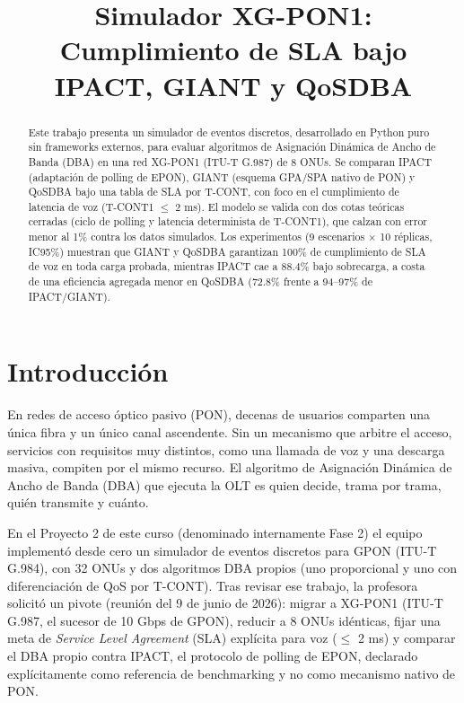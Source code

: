 \documentclass[conference]{IEEEtran}
\begin{document}
\title{Simulador XG-PON1: Cumplimiento de SLA bajo IPACT, GIANT y QoSDBA}

\author{
}

\maketitle

\begin{abstract}
Este trabajo presenta un simulador de eventos discretos, desarrollado en
Python puro sin frameworks externos, para evaluar algoritmos de Asignación
Dinámica de Ancho de Banda (DBA) en una red XG-PON1 (ITU-T G.987) de 8
ONUs. Se comparan IPACT (adaptación de polling de EPON), GIANT (esquema
GPA/SPA nativo de PON) y QoSDBA bajo una tabla de SLA por T-CONT, con foco
en el cumplimiento de latencia de voz (T-CONT1 $\leq$ 2 ms). El modelo se
valida con dos cotas teóricas cerradas (ciclo de polling y latencia
determinista de T-CONT1), que calzan con error menor al 1\% contra los
datos simulados. Los experimentos (9 escenarios $\times$ 10 réplicas,
IC95\%) muestran que GIANT y QoSDBA garantizan 100\% de cumplimiento de
SLA de voz en toda carga probada, mientras IPACT cae a 88.4\% bajo
sobrecarga, a costa de una eficiencia agregada menor en QoSDBA (72.8\%
frente a 94--97\% de IPACT/GIANT).
\end{abstract}

\section{Introducción}

En redes de acceso óptico pasivo (PON), decenas de usuarios comparten una
única fibra y un único canal ascendente. Sin un mecanismo que arbitre el
acceso, servicios con requisitos muy distintos, como una llamada de voz y
una descarga masiva, compiten por el mismo recurso. El algoritmo de
Asignación Dinámica de Ancho de Banda (DBA) que ejecuta la OLT es quien
decide, trama por trama, quién transmite y cuánto.

En el Proyecto 2 de este curso (denominado internamente Fase 2) el equipo
implementó desde cero un simulador de eventos discretos para GPON
(ITU-T G.984), con 32 ONUs y dos algoritmos DBA propios (uno proporcional
y uno con diferenciación de QoS por T-CONT). Tras revisar ese trabajo, la
profesora solicitó un pivote (reunión del 9 de junio de 2026): migrar a
XG-PON1 (ITU-T G.987, el sucesor de 10 Gbps de GPON), reducir a
8 ONUs idénticas, fijar una meta de \emph{Service Level Agreement} (SLA)
explícita para voz ($\leq$ 2 ms) y comparar el DBA propio contra
IPACT, el protocolo de polling de EPON, declarado explícitamente
como referencia de benchmarking y no como mecanismo nativo de PON.
\end{document}
